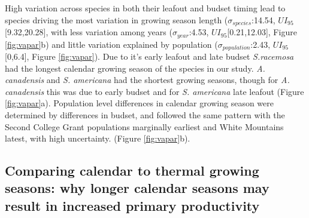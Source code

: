 \documentclass{article}[12pt]
\begin{document}
High variation across species in both their leafout and budset timing lead to species driving the most variation in  growing season length  ($\sigma_{species}$:14.54, $UI_{95}$[9.32,20.28], with less variation among years ($\sigma_{year}$:4.53, $UI_{95}$[0.21,12.03], Figure \ref{fig:vapar}b) and little variation explained by population ($\sigma_{population}$:2.43, $UI_{95}$[0,6.4], Figure \ref{fig:vapar}). Due to it's early leafout and late budset \emph{S.racemosa} had the longest calendar growing season of the species in our study. \emph{A. canadensis} and \emph{S. americana} had the shortest growing seasons, though for \emph{A. canadensis} this was due to early budset and for \emph{S. americana} late leafout (Figure \ref{fig:vapar}a). Population level differences in calendar growing season were determined by differences in budset, and followed the same pattern with the Second College Grant populations marginally earliest and White Mountains latest, with high uncertainty. (Figure \ref{fig:vapar}b). 
\subsection{Comparing calendar to thermal growing seasons: why longer calendar seasons may result in increased primary productivity}
\end{document}
